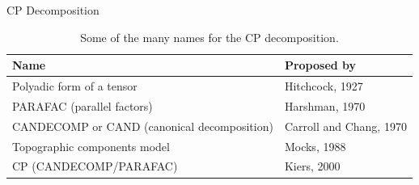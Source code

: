 \documentclass[t, 10pt, handout, aspectratio=169]{beamer}
\begin{document}
\begin{frame}{CP Decomposition}
\large
\begin{table}
\begin{tabular}{l | l}
Name & Proposed by \\
\hline \hline
Polyadic form of a tensor & Hitchcock, 1927 \\ 
PARAFAC (parallel factors) & Harshman, 1970\\
CANDECOMP or CAND (canonical decomposition) & Carroll and Chang, 1970\\
Topographic components model & Mocks, 1988 \\
CP (CANDECOMP/PARAFAC) & Kiers, 2000
\end{tabular}
\caption{Some of the many names for the CP decomposition.}
\end{table}
\end{frame}

\end{document}
